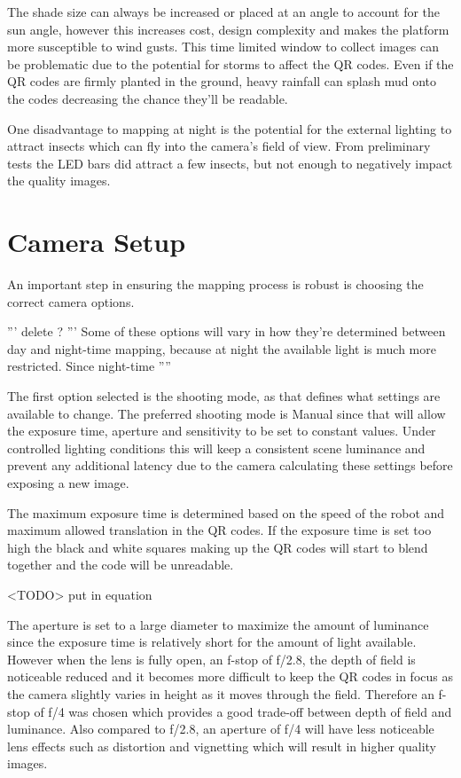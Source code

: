 The shade size can always be increased or placed at an angle to account for the sun angle, however this increases cost, design complexity and makes the platform more susceptible to wind gusts.  This time limited window to collect images can be problematic due to the potential for storms to affect the QR codes.  Even if the QR codes are firmly planted in the ground, heavy rainfall can splash mud onto the codes decreasing the chance they'll be readable. 

One disadvantage to mapping at night is the potential for the external lighting to attract insects which can fly into the camera's field of view.  From preliminary tests the LED bars did attract a few insects, but not enough to negatively impact the quality images. 

\section{Camera Setup}

An important step in ensuring the mapping process is robust is choosing the correct camera options. 

''' delete ? '''
 Some of these options will vary in how they're determined between day and night-time mapping, because at night the available light is much more restricted.  Since night-time 
''''

The first option selected is the shooting mode, as that defines what settings are available to change.  The preferred shooting mode is Manual since that will allow the exposure time, aperture and sensitivity to be set to constant values.  Under controlled lighting conditions this will keep a consistent scene luminance and prevent any additional latency due to the camera calculating these settings before exposing a new image.

The maximum exposure time is determined based on the speed of the robot and maximum allowed translation in the QR codes.  If the exposure time is set too high the black and white squares making up the QR codes will start to blend together and the code will be unreadable.  

<TODO> put in equation 

The aperture is set to a large diameter to maximize the amount of luminance since the exposure time is relatively short for the amount of light available.  However when the lens is fully open, an f-stop of f/2.8, the depth of field is noticeable reduced and it becomes more difficult to keep the QR codes in focus as the camera slightly varies in height as it moves through the field.  Therefore an f-stop of f/4 was chosen which provides a good trade-off between depth of field and luminance.  Also compared to f/2.8, an aperture of f/4 will have less noticeable lens effects such as distortion and vignetting which will result in higher quality images.  

